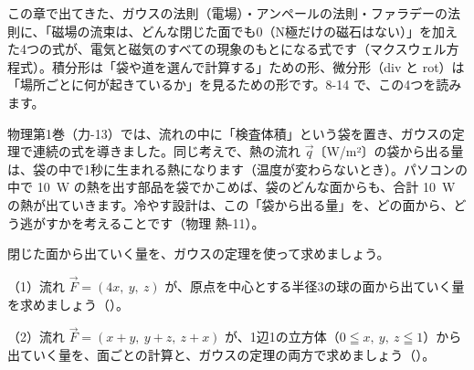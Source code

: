 \begin{butsuri}
この章で出てきた、ガウスの法則（電場）・アンペールの法則・ファラデーの法則に、「磁場の流束は、どんな閉じた面でも0（N極だけの磁石はない）」を加えた4つの式が、電気と磁気のすべての現象のもとになる式です（マクスウェル方程式）。積分形は「袋や道を選んで計算する」ための形、微分形（div と rot）は「場所ごとに何が起きているか」を見るための形です。8-14 で、この4つを読みます。
\par\vspace{4pt}
\noindent\begin{minipage}[c]{0.70\linewidth}
\raggedright
物理第1巻（力-13）では、流れの中に「検査体積」という袋を置き、ガウスの定理で連続の式を導きました。同じ考えで、熱の流れ $\vec q$〔W/m²〕の袋から出る量は、袋の中で1秒に生まれる熱になります（温度が変わらないとき）。パソコンの中で \qty{10}{W} の熱を出す部品を袋でかこめば、袋のどんな面からも、合計 \qty{10}{W} の熱が出ていきます。冷やす設計は、この「袋から出る量」を、どの面から、どう逃がすかを考えることです（物理 熱-11）。
\end{minipage}\hfill
\begin{minipage}[c]{0.27\linewidth}
\centering
{}
\end{minipage}
\end{butsuri}

\bkendproblems
{}

\bkproblem 閉じた面から出ていく量を、ガウスの定理を使って求めましょう。\par
（1）流れ $\vec F=(4x,\ y,\ z)$ が、原点を中心とする半径3の球の面から出ていく量を求めましょう\mbox{（）}。\par
（2）流れ $\vec F=(x+y,\ y+z,\ z+x)$ が、1辺1の立方体（$0\leqq x,\ y,\ z\leqq1$）から出ていく量を、面ごとの計算と、ガウスの定理の両方で求めましょう\mbox{（）}。

